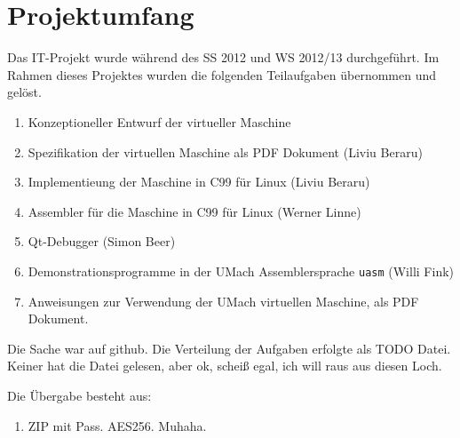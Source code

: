 \section{Projektumfang}

Das IT-Projekt wurde während des SS 2012 und WS 2012/13 durchgeführt. Im Rahmen
dieses Projektes wurden die folgenden Teilaufgaben übernommen und gelöst.

\begin{enumerate}
\item Konzeptioneller Entwurf der virtueller Maschine
\item Spezifikation der virtuellen Maschine als PDF Dokument (Liviu Beraru)
\item Implementieung der Maschine in C99 für Linux (Liviu Beraru)
\item Assembler für die Maschine in C99 für Linux (Werner Linne)
\item Qt-Debugger (Simon Beer)
\item Demonstrationsprogramme in der UMach Assemblersprache \texttt{uasm} (Willi
Fink)
\item Anweisungen zur Verwendung der UMach virtuellen Maschine, als PDF
Dokument.
\end{enumerate}


Die Sache war auf github. Die Verteilung der Aufgaben erfolgte als TODO Datei.
Keiner hat die Datei gelesen, aber ok, scheiß egal, ich will raus aus diesen
Loch.

Die Übergabe besteht aus:

\begin{enumerate}
  \item ZIP mit Pass. AES256. Muhaha.
\end{enumerate}







